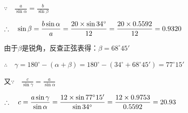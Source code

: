 \begin{solution}
$\because\quad \frac{a}{\sin\alpha}=\frac{b}{\sin\beta}$

$\therefore\quad \sin\beta=\dfrac{b\sin\alpha}{a}=\dfrac{20\times \sin 34^{\circ}}{12}=\dfrac{20\times 0.5592}{12}=0.9320$

由于$\beta$是锐角，反查正弦表得：$\beta=68^{\circ}45'$

$\therefore\quad \gamma=180^{\circ}-(\alpha+\beta)=180^{\circ}-(34^{\circ}+68^{\circ}45')=77^{\circ}15'$

又$\because\quad \frac{c}{\sin\gamma}=\frac{a}{\sin\alpha}$

$\therefore\quad c=\dfrac{a\sin\gamma}{\sin\alpha}=\dfrac{12\times \sin 77^{\circ}15'}{\sin 34^{\circ}}=\dfrac{12\times 0.9753}{0.5592}=20.93$
\end{solution}


